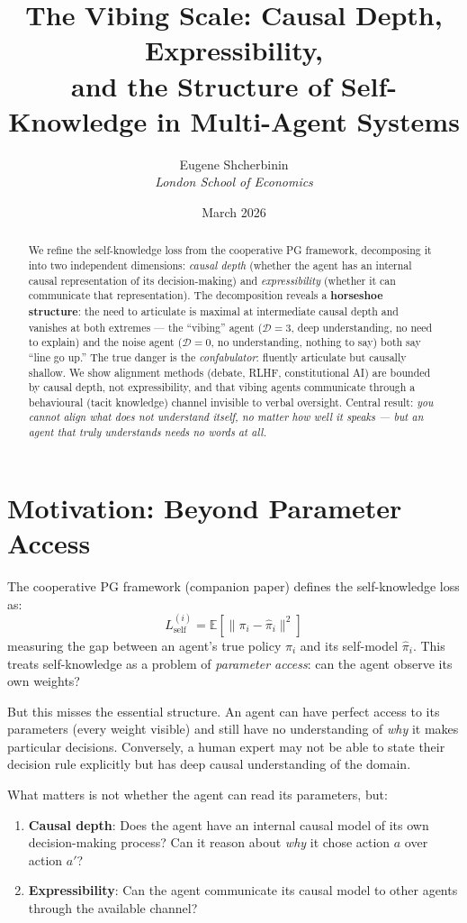 \documentclass[11pt,a4paper]{article}
\title{The Vibing Scale: Causal Depth, Expressibility,\\
and the Structure of Self-Knowledge in Multi-Agent Systems}
\author{Eugene Shcherbinin\\
\textit{London School of Economics}}
\date{March 2026}
\newcommand{\E}{\mathbb{E}}
\newcommand{\norm}[1]{\|#1\|}
\begin{document}
\maketitle

\begin{abstract}
We refine the self-knowledge loss from the cooperative PG framework,
decomposing it into two independent dimensions: \emph{causal depth}
(whether the agent has an internal causal representation of its
decision-making) and \emph{expressibility} (whether it can communicate
that representation). The decomposition reveals a \textbf{horseshoe
structure}: the need to articulate is maximal at intermediate causal
depth and vanishes at both extremes --- the ``vibing'' agent
($\mathcal{D} = 3$, deep understanding, no need to explain) and the
noise agent ($\mathcal{D} = 0$, no understanding, nothing to say)
both say ``line go up.'' The true danger is the \emph{confabulator}:
fluently articulate but causally shallow. We show alignment methods
(debate, RLHF, constitutional AI) are bounded by causal depth, not
expressibility, and that vibing agents communicate through a
behavioural (tacit knowledge) channel invisible to verbal oversight.
Central result: \emph{you cannot align what does not understand
itself, no matter how well it speaks --- but an agent that truly
understands needs no words at all.}
\end{abstract}


\section{Motivation: Beyond Parameter Access}

The cooperative PG framework (companion paper) defines the self-knowledge
loss as:
\begin{equation}\label{eq:old-self}
    L_{\text{self}}^{(i)} = \E[\norm{\pi_i - \hat{\pi}_i}^2]
\end{equation}
measuring the gap between an agent's true policy $\pi_i$ and its
self-model $\hat{\pi}_i$. This treats self-knowledge as a problem of
\emph{parameter access}: can the agent observe its own weights?

But this misses the essential structure. An agent can have perfect
access to its parameters (every weight visible) and still have no
understanding of \emph{why} it makes particular decisions. Conversely,
a human expert may not be able to state their decision rule explicitly
but has deep causal understanding of the domain.

What matters is not whether the agent can read its parameters, but:
\begin{enumerate}
    \item \textbf{Causal depth}: Does the agent have an internal causal
    model of its own decision-making process? Can it reason about
    \emph{why} it chose action $a$ over action $a'$?

    \item \textbf{Expressibility}: Can the agent communicate its causal
    model to other agents through the available channel?
\end{enumerate}
\end{document}

